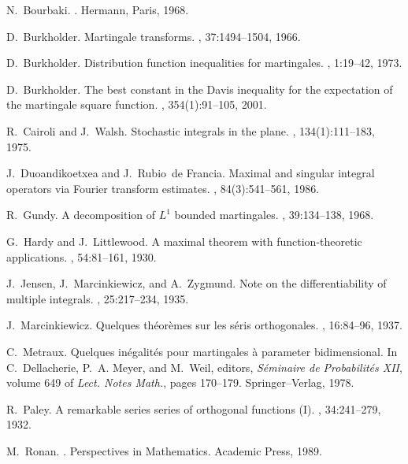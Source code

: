 \documentclass[a4paper]{amsart}
\theoremstyle{plain}
\theoremstyle{definition}
\theoremstyle{remark}
\numberwithin{equation}{section}
\theoremstyle{plain}
\begin{document}
\begin{thebibliography}{10}
N.~Bourbaki.
.
\newblock Hermann, Paris, 1968.

D.~Burkholder.
\newblock Martingale transforms.
, 37:1494--1504, 1966.

D.~Burkholder.
\newblock Distribution function inequalities for martingales.
, 1:19--42, 1973.

D.~Burkholder.
\newblock The best constant in the {D}avis inequality for the expectation of
  the martingale square function.
, 354(1):91--105, 2001.

R.~Cairoli and J.~Walsh.
\newblock Stochastic integrals in the plane.
, 134(1):111--183, 1975.

J.~Duoandikoetxea and J.~Rubio~de Francia.
\newblock Maximal and singular integral operators via {F}ourier transform
  estimates.
, 84(3):541--561, 1986.

R.~Gundy.
\newblock A decomposition of {$L^1$} bounded martingales.
, 39:134--138, 1968.

G.~Hardy and J.~Littlewood.
\newblock A maximal theorem with function-theoretic applications.
, 54:81--161, 1930.

J.~Jensen, J.~Marcinkiewicz, and A.~Zygmund.
\newblock Note on the differentiability of multiple integrals.
, 25:217--234, 1935.

J.~Marcinkiewicz.
\newblock Quelques th\'eor\`emes sur les s\'eris orthogonales.
, 16:84--96, 1937.

C.~Metraux.
\newblock Quelques in\'egalit\'es pour martingales \`a parameter bidimensional.
\newblock In C.~Dellacherie, P.~A. Meyer, and M.~Weil, editors, {\em
  S\'eminaire de {P}robabilit\'es {XII}}, volume 649 of {\em Lect. Notes
  Math.}, pages 170--179. Springer--Verlag, 1978.

R.~Paley.
\newblock A remarkable series series of orthogonal functions {(I)}.
, 34:241--279, 1932.

M.~Ronan.
.
\newblock Perspectives in Mathematics. Academic Press, 1989.


\end{thebibliography}
\end{document}
